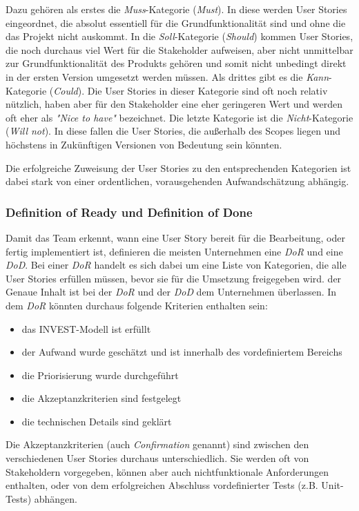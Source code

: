 \documentclass[acmtog]{acmart}
\begin{document}
Dazu gehören als erstes die \emph{Muss}-Kategorie (\emph{Must}). In diese werden User Stories eingeordnet, die absolut essentiell für die Grundfunktionalität sind und ohne die das 
Projekt nicht auskommt. In die \emph{Soll}-Kategorie (\emph{Should}) kommen User Stories, die noch durchaus viel Wert für die Stakeholder aufweisen, aber nicht unmittelbar zur Grundfunktionalität 
des Produkts gehören und somit nicht unbedingt direkt in der ersten Version umgesetzt werden müssen. Als drittes gibt es die \emph{Kann}-Kategorie (\emph{Could}). Die User Stories in dieser Kategorie sind oft 
noch relativ nützlich, haben aber für den Stakeholder eine eher geringeren Wert und werden oft eher als \emph{"Nice to have"} bezeichnet. Die letzte Kategorie ist die \emph{Nicht}-Kategorie 
(\emph{Will not}). In diese fallen die User Stories, die außerhalb des Scopes liegen und höchstens in Zukünftigen Versionen von Bedeutung sein könnten. \cite{moscow}

Die erfolgreiche Zuweisung der User Stories zu den entsprechenden Kategorien ist dabei stark von einer ordentlichen, vorausgehenden Aufwandschätzung abhängig. \cite{moscow}


\subsubsection{Definition of Ready und Definition of Done}

Damit das Team erkennt, wann eine User Story bereit für die Bearbeitung, oder fertig implementiert ist, definieren die meisten Unternehmen eine \emph{DoR} und eine \emph{DoD}. 
Bei einer \emph{DoR} handelt es sich dabei um eine Liste von Kategorien, die alle User Stories erfüllen müssen, bevor sie für die Umsetzung freigegeben wird. der Genaue Inhalt 
ist bei der \emph{DoR} und der \emph{DoD} dem Unternehmen überlassen. In dem \emph{DoR} könnten durchaus folgende Kriterien enthalten sein: 
\begin{itemize}
  \item das INVEST-Modell ist erfüllt
  \item der Aufwand wurde geschätzt und ist innerhalb des vordefiniertem Bereichs
  \item die Priorisierung wurde durchgeführt
  \item die Akzeptanzkriterien sind festgelegt
  \item die technischen Details sind geklärt
\end{itemize}

Die Akzeptanzkriterien (auch \emph{Confirmation} genannt) sind zwischen den verschiedenen User Stories durchaus unterschiedlich. 
Sie werden oft von Stakeholdern vorgegeben, können aber auch nichtfunktionale Anforderungen enthalten, oder von dem erfolgreichen 
Abschluss vordefinierter Tests (z.B. Unit-Tests) abhängen.
\end{document}
